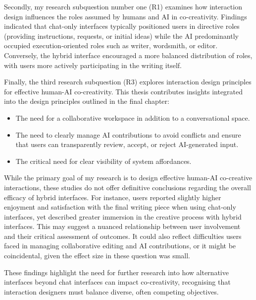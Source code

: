Secondly, my research subquestion number one (R1) examines how interaction design influences the roles assumed by humans and AI in co-creativity. Findings indicated that chat-only interfaces typically positioned users in directive roles (providing instructions, requests, or initial ideas) while the AI predominantly occupied execution-oriented roles such as writer, wordsmith, or editor. Conversely, the hybrid interface encouraged a more balanced distribution of roles, with users more actively participating in the writing itself.

Finally, the third research subquestion (R3) explores interaction design principles for effective human-AI co-creativity. This thesis contributes insights integrated into the design principles outlined in the final chapter:

\begin{itemize}
    \item The need for a collaborative workspace in addition to a conversational space.
    \item The need to clearly manage AI contributions to avoid conflicts and ensure that users can transparently review, accept, or reject AI-generated input.
    \item The critical need for clear visibility of system affordances.
\end{itemize}

While the primary goal of my research is to design effective human-AI co-creative interactions, these studies do not offer definitive conclusions regarding the overall efficacy of hybrid interfaces. For instance, users reported slightly higher enjoyment and satisfaction with the final writing piece when using chat-only interfaces, yet described greater immersion in the creative process with hybrid interfaces. This may suggest a nuanced relationship between user involvement and their critical assessment of outcomes. It could also reflect difficulties users faced in managing collaborative editing and AI contributions, or it might be coincidental, given the effect size in these question was small.

These findings highlight the need for further research into how alternative interfaces beyond chat interfaces can impact co-creativity, recognising that interaction designers must balance diverse, often competing objectives.


